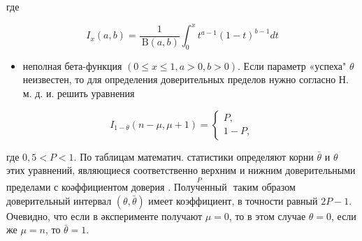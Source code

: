 \documentclass[10pt]{article}
\begin{document}
где



\[

I_{x}(a, b)=\frac{1}{\mathrm{~B}(a, b)} \int_{0}^{x} t^{a-1}(1-t)^{b-1} d t

\]



\begin{itemize}

  \item неполная бета-функция $(0 \leqslant x \leqslant 1, a>0, b>0)$. Если параметр «успеха" $\theta$ неизвестен, то для определения доверительных пределов нужно согласно Н. м. д. и. решить уравнения

\end{itemize}



\[

I_{1-\theta}(n-\mu, \mu+1)=\left\{\begin{array}{l}

P, \\

1-P,

\end{array}\right.

\]



где $0,5<P<1$. По таблицам математич. статистики определяют корни $\bar{\theta}$ и $\theta$ этих уравнений, являющиеся соответственно верхним и нижним доверительными пределами с коәффициентом доверия $\stackrel{P}{\text {. Полученный }}$ таким образом доверительный интервал $(\theta, \bar{\theta})$ имеет коэффициент, в точности равный $2 P-1$. Очевидно, что если в әксперименте получают $\mu=0$, то в этом случае $\theta=0$, если же $\mu=n$, то $\bar{\theta}=1$.
\end{document}
